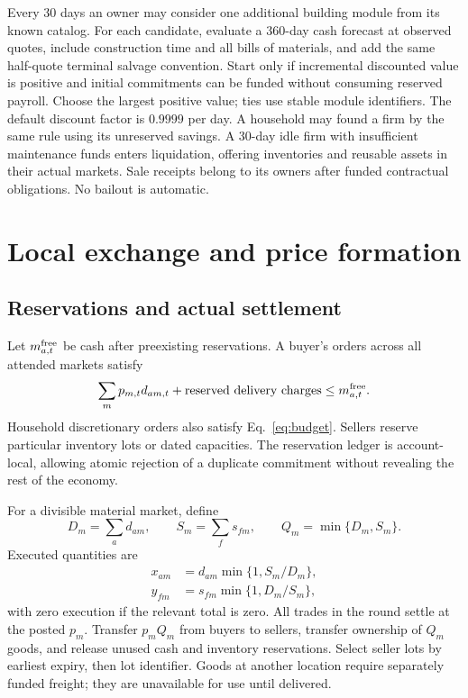 \documentclass[10pt,a4paper,twocolumn]{article}
\begin{document}
Every 30 days an owner may consider one additional building module from
its known catalog. For each candidate, evaluate a 360-day cash forecast
at observed quotes, include construction time and all bills of materials,
and add the same half-quote terminal salvage convention. Start only if
incremental discounted value is positive and initial commitments can be
funded without consuming reserved payroll. Choose the largest positive
value; ties use stable module identifiers. The default discount factor
is $0.9999$ per day. A household may found a firm by the same rule using
its unreserved savings. A 30-day idle firm with insufficient maintenance
funds enters liquidation, offering inventories and reusable assets in
their actual markets. Sale receipts belong to its owners after funded
contractual obligations. No bailout is automatic.

\section{Local exchange and price formation}
\subsection{Reservations and actual settlement}
Let $m^{\rm free}_{a,t}$ be cash after preexisting reservations. A buyer's
orders across all attended markets satisfy
\begin{equation}
 \sum_m p_{m,t}d_{am,t}
 +\text{reserved delivery charges}
 \leq m^{\rm free}_{a,t}.
 \label{eq:escrow}
\end{equation}
Household discretionary orders also satisfy Eq.~\eqref{eq:budget}.
Sellers reserve particular inventory lots or dated capacities. The
reservation ledger is account-local, allowing atomic rejection of a
duplicate commitment without revealing the rest of the economy.

For a divisible material market, define
\begin{equation}
 D_m=\sum_a d_{am},\qquad S_m=\sum_f s_{fm},\qquad
 Q_m=\min\{D_m,S_m\}.
\end{equation}
Executed quantities are
\begin{align}
 x_{am}&=d_{am}\min\{1,S_m/D_m\},\label{eq:buyfill}\\
 y_{fm}&=s_{fm}\min\{1,D_m/S_m\},\label{eq:sellfill}
\end{align}
with zero execution if the relevant total is zero. All trades in the
round settle at the posted $p_m$. Transfer $p_mQ_m$ from buyers to
sellers, transfer ownership of $Q_m$ goods, and release unused cash and
inventory reservations. Select seller lots by earliest expiry, then lot
identifier. Goods at another location require separately funded freight;
they are unavailable for use until delivered.
\end{document}
